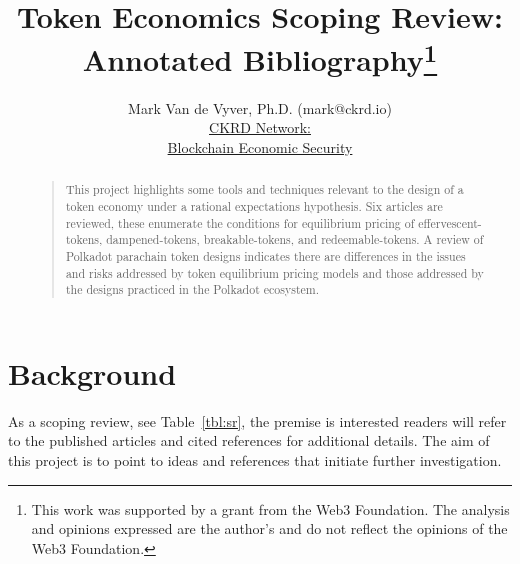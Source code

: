 \documentclass[11pt]{article}
\def \ckrdurl{https://ckrd.io/}
\begin{document}


\title{Token Economics Scoping Review:\\Annotated Bibliography\footnote{This work was supported by a grant from the Web3 Foundation. The analysis and opinions expressed are the author's and do not reflect the opinions of the Web3 Foundation.}}
\author{Mark Van de Vyver, Ph.D. (mark@ckrd.io)\\
\href{\ckrdurl}{CKRD Network:}\\
\href{\ckrdurl}{Blockchain Economic Security}\\
}
\maketitle
\begin{abstract}
\begin{quote}
This project highlights some tools and techniques relevant to the design of a token economy under a rational expectations hypothesis.  Six articles are reviewed, these enumerate the conditions for equilibrium pricing of effervescent-tokens, dampened-tokens, breakable-tokens, and redeemable-tokens. A review of Polkadot parachain token designs indicates there are differences in the issues and risks addressed by token equilibrium pricing models and those addressed by the designs practiced in the Polkadot ecosystem.
\end{quote}
\end{abstract}

\tableofcontents

\section{Background}

As a scoping review, see Table~\ref{tbl:sr}, the premise is interested readers will refer to the published articles and cited references for additional details.  The aim of this project is to point to ideas and references that initiate further investigation.
\end{document}
